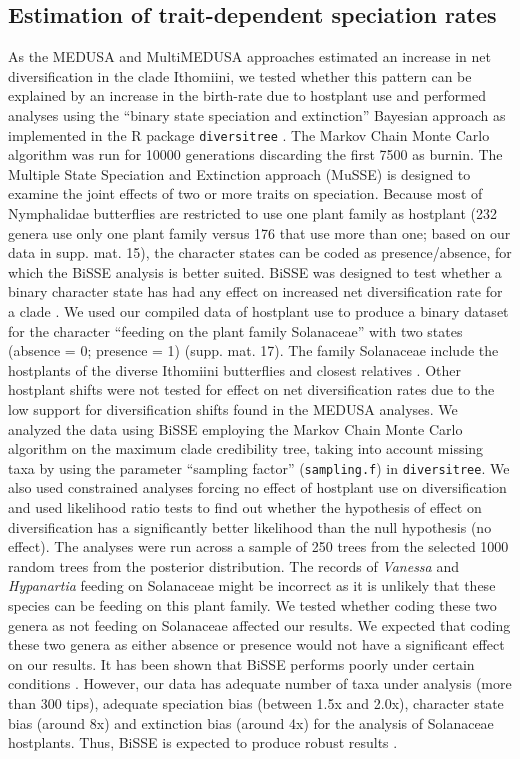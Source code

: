 \documentclass[10pt]{article}
\begin{document}
\subsection*{Estimation of trait-dependent speciation
rates}

As the MEDUSA and MultiMEDUSA approaches estimated an increase in net
diversification in the clade Ithomiini, we tested whether this pattern
can be explained by an increase in the birth-rate due to hostplant use
and performed analyses using the ``binary state speciation and
extinction'' \cite{maddison2007} Bayesian approach as implemented in the R package
\texttt{diversitree} \cite{fitzjohn2012}. The Markov Chain Monte Carlo algorithm
was run for 10000 generations discarding the first 7500 as burnin. The
Multiple State Speciation and Extinction approach (MuSSE) \cite{fitzjohn2012} is
designed to examine the joint effects of two or more traits on
speciation. Because most of Nymphalidae butterflies are restricted to
use one plant family as hostplant (232 genera use only one plant family
versus 176 that use more than one; based on our data in supp. mat. 15),
the character states can be coded as presence/absence, for which the
BiSSE analysis is better suited. BiSSE was designed to test whether a
binary character state has had any effect on increased net
diversification rate for a clade \cite{maddison2007}. We used our compiled data of
hostplant use to produce a binary dataset for the character ``feeding on
the plant family Solanaceae'' with two states (absence = 0; presence =
1) (supp. mat. 17). The family Solanaceae include the hostplants of the
diverse Ithomiini butterflies and closest relatives \cite{willmott2006}. Other
hostplant shifts were not tested for effect on net diversification rates
due to the low support for diversification shifts found in the MEDUSA
analyses. We analyzed the data using BiSSE employing the Markov Chain
Monte Carlo algorithm on the maximum clade credibility tree, taking into
account missing taxa by using the parameter ``sampling factor''
(\texttt{sampling.f}) in \texttt{diversitree}. We also used constrained
analyses forcing no effect of hostplant use on diversification and used
likelihood ratio tests to find out whether the hypothesis of effect on
diversification has a significantly better likelihood than the null
hypothesis (no effect). The analyses were run across a sample of 250
trees from the selected 1000 random trees from the posterior
distribution. The records of \emph{Vanessa} and \emph{Hypanartia}
feeding on Solanaceae \cite{beccaloni2008, scott1986} might be incorrect as it is unlikely
that these species can be feeding on this plant family. We tested
whether coding these two genera as not feeding on Solanaceae affected
our results. We expected that coding these two genera as either absence
or presence would not have a significant effect on our results. It has
been shown that BiSSE performs poorly under certain conditions \cite{davis2013}.
However, our data has adequate number of taxa under analysis (more than
300 tips), adequate speciation bias (between 1.5x and 2.0x), character
state bias (around 8x) and extinction bias (around 4x) for the analysis
of Solanaceae hostplants. Thus, BiSSE is expected to produce robust
results \cite{davis2013}.
\end{document}
